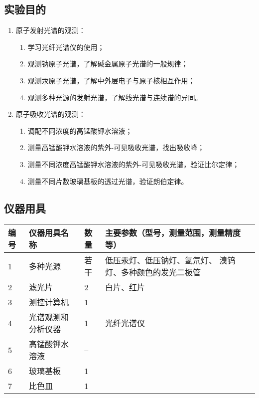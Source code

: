 \documentclass[dvipsnames, svgnames,a4paper,11pt]{article}
\begin{document}
\subsection{实验目的}
	\begin{enumerate}
		\item 原子发射光谱的观测：
			\begin{enumerate}
				\item 学习光纤光谱仪的使用；
				\item 观测钠原子光谱，了解碱金属原子光谱的一般规律；
				\item 观测汞原子光谱，了解中外层电子与原子核相互作用；
				\item 观测多种光源的发射光谱，了解线光谱与连续谱的异同。
			\end{enumerate}
		\item  原子吸收光谱的观测：
			\begin{enumerate}
				\item 调配不同浓度的高锰酸钾水溶液；
				\item 测量高锰酸钾水溶液的紫外-可见吸收光谱，找出吸收峰；
				\item 测量不同浓度高锰酸钾水溶液的紫外-可见吸收光谱，验证比尔定律；
				\item 测量不同片数玻璃基板的透过光谱，验证朗伯定律。
			\end{enumerate}
	\end{enumerate}
	

\subsection{仪器用具}
	\begin{table}[htbp]
		\centering
		\renewcommand\arraystretch{1.6}
		\begin{tabular}{p{}|p{}|p{}|p{}}
		\hline
		编号& 仪器用具名称 & 数量 &  主要参数（型号，测量范围，测量精度等） \\
		\hline
		1 & 多种光源 	& 若干	& {\footnotesize 低压汞灯、低压钠灯、氢氘灯、 溴钨灯、多种颜色的发光二极管} \\
	
		2 & 滤光片 	& 2 	& 白片、红片 \\
		
		3 & 测控计算机 & 1 &  \\
		
		4 & 光谱观测和分析仪器 & 1 & 光纤光谱仪\\
		
		5 & 高锰酸钾水溶液 & -- &  \\
		
		6 & 玻璃基板 & 1  &  \\
		
		7 & 比色皿 & 1 & \\
		
		\hline
		\end{tabular}
	\end{table}
\end{document}

